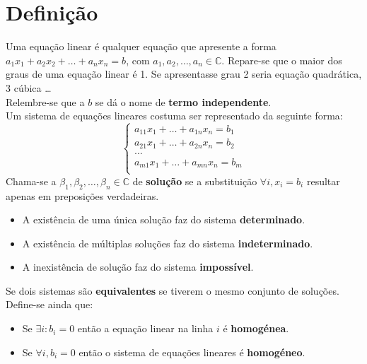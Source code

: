 \documentclass[]{report}
\begin{document}
\section{Definição}
Uma equação linear é qualquer equação que apresente a forma $a_1 x_1 + a_2 x_2 + \dots + a_n x_n = b$, com $a_1, a_2, \dots, a_n \in \mathbb{C}$.
Repare-se que o maior dos graus de uma equação linear é 1. Se apresentasse grau 2 seria equação quadrática, 3 cúbica \dots\\
Relembre-se que a $b$ se dá o nome de \textbf{termo independente}.\\[0.2cm]
Um sistema de equações lineares costuma ser representado da seguinte forma:
$$
\begin{cases}
a_{11} x_1 + \dots + a_{1n} x_n = b_1\\
a_{21} x_1 + \dots + a_{2n} x_n = b_2\\
\dots\\
a_{m1} x_1 + \dots + a_{mn} x_n = b_m\\
\end{cases}
$$
Chama-se a $\beta_1, \beta_2, \dots, \beta_n \in \mathbb{C}$ de \textbf{solução} se a substituição $\forall i, x_i = b_i$ resultar apenas em preposições verdadeiras.
\begin{itemize}
\item A existência de uma única solução faz do sistema \textbf{determinado}.
\item A existência de múltiplas soluções faz do sistema \textbf{indeterminado}.
\item A inexistência de solução faz do sistema \textbf{impossível}.
\end{itemize}
Se dois sistemas são \textbf{equivalentes} se tiverem o mesmo conjunto de soluções.
Define-se ainda que:
\begin{itemize}
\item Se $\exists i : b_i = 0$ então a equação linear na linha $i$ é \textbf{homogénea}.
\item Se $\forall i, b_i = 0$ então o sistema de equações lineares é \textbf{homogéneo}.
\end{itemize}
\end{document}
